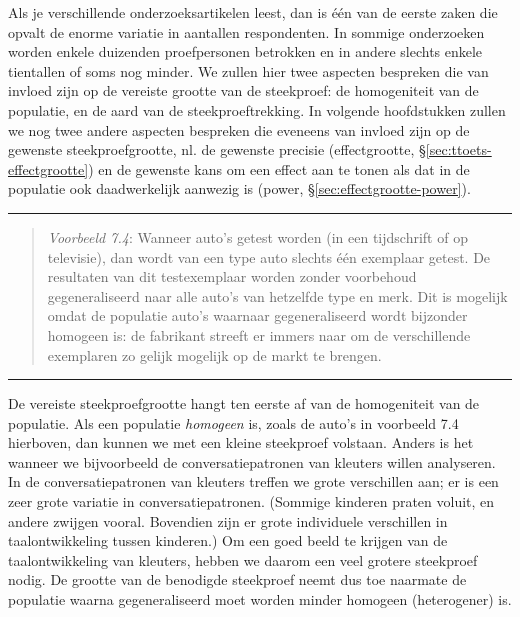 \documentclass[
]{book}
\begin{document}
Als je verschillende onderzoeksartikelen leest, dan is één van de eerste
zaken die opvalt de enorme variatie in aantallen respondenten. In
sommige onderzoeken worden enkele duizenden proefpersonen betrokken en
in andere slechts enkele tientallen of soms nog minder. We zullen hier
twee aspecten bespreken die van invloed zijn op de vereiste grootte van
de steekproef: de homogeniteit van de populatie, en de aard van de
steekproeftrekking. In volgende hoofdstukken zullen we nog twee andere
aspecten bespreken die eveneens van invloed zijn op de gewenste
steekproefgrootte, nl. de gewenste precisie (effectgrootte,
§\ref{sec:ttoets-effectgrootte}) en de gewenste kans om een effect
aan te tonen als dat in de populatie ook daadwerkelijk aanwezig is
(power,
§\ref{sec:effectgrootte-power}).

\begin{center}\rule{0.5\linewidth}{0.5pt}\end{center}

\begin{quote}
\emph{Voorbeeld 7.4}: Wanneer auto's getest worden (in een
tijdschrift of op televisie), dan wordt van een type auto slechts één
exemplaar getest. De resultaten van dit testexemplaar worden zonder
voorbehoud gegeneraliseerd naar alle auto's van hetzelfde type en merk.
Dit is mogelijk omdat de populatie auto's waarnaar gegeneraliseerd wordt
bijzonder homogeen is: de fabrikant streeft er immers naar om de
verschillende exemplaren zo gelijk mogelijk op de markt te brengen.
\end{quote}

\begin{center}\rule{0.5\linewidth}{0.5pt}\end{center}

De vereiste steekproefgrootte hangt ten eerste af van de homogeniteit
van de populatie. Als een populatie \emph{homogeen} is, zoals de auto's in
voorbeeld 7.4 hierboven, dan kunnen we met een kleine
steekproef volstaan. Anders is het wanneer we bijvoorbeeld de
conversatiepatronen van kleuters willen analyseren. In de
conversatiepatronen van kleuters treffen we grote verschillen aan; er is
een zeer grote variatie in conversatiepatronen. (Sommige kinderen praten
voluit, en andere zwijgen vooral. Bovendien zijn er grote individuele
verschillen in taalontwikkeling tussen kinderen.) Om een goed beeld te
krijgen van de taalontwikkeling van kleuters, hebben we daarom een veel
grotere steekproef nodig. De grootte van de benodigde steekproef neemt
dus toe naarmate de populatie waarna gegeneraliseerd moet worden minder
homogeen (heterogener) is.
\end{document}
